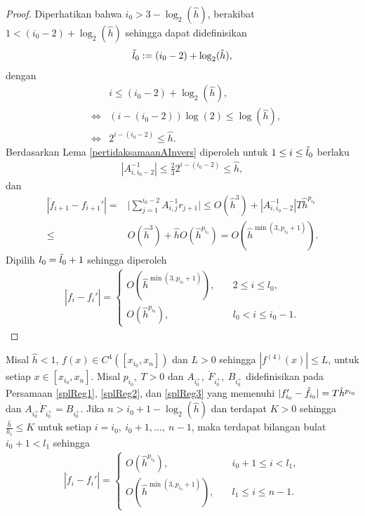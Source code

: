 \begin{proof}
    Diperhatikan bahwa $i_0 > 3 - \log_2(\hat{h})$, berakibat $1 < (i_0 - 2) + \log_2(\hat{h})$ sehingga dapat didefinisikan
    \begin{align*}
        \Tilde{l}_0 :=(i_0 - 2) + \log_2(\hat{h}),
    \end{align*}
    dengan
    \begin{align*}
        &&i \leq (i_0 - 2) + \log_2(\hat{h}), \\
        &\Leftrightarrow&(i - (i_0 - 2))\log(2) \leq \log(\hat{h}),\\
        &\Leftrightarrow&2^{i-(i_0 - 2)} \leq \hat{h}.
    \end{align*}
    Berdasarkan Lema \ref{pertidaksamaanAInvers} diperoleh untuk $1 \leq i \leq \Tilde{l}_0$ berlaku
    \begin{align*}
        |A_{i,{i_0-2}}^{-1}| \leq \frac{2}{3}2^{i-(i_0 - 2)} \leq \hat{h},
    \end{align*}
    dan 
    \begin{align*}
        |\dot{f}_{i+1} - f_{i+1}'| =& \Bigg| \sum_{j=1}^{i_0 - 2} A_{i,j}^{-1}r_{j+1} \Bigg| \leq O(\hat{h}^3) + |A_{i,{i_0-2}}^{-1}|T\hat{h}^{p_{i_0}} \\
        \leq& O(\hat{h}^3) + \hat{h}O(\hat{h}^{p_{i_0}}) = O(\hat{h}^{\min(3,p_{i_0}+1)}).
    \end{align*}
    Dipilih $l_0 = \Tilde{l}_0 + 1$ sehingga diperoleh
    \begin{align*}
        |\dot{f}_i - f_i'|=\begin{cases}
            O(\hat{h}^{\min(3,p_{i_0}+1)}), \quad &2\leq i\leq l_0,\\
            O(\hat{h}^{p_{i_0}}), \quad &l_0<i\leq i_0 - 1.
        \end{cases}
    \end{align*}
\end{proof}

\begin{proposisi}\label{prpsi_l1}
Misal $\hat{h} < 1$, $f(x) \in C^4([x_{i_0},x_{n}])$ dan $L > 0$ sehingga \mbox{$|f^{(4)}(x)| \leq L$}, untuk setiap $x\in[x_{i_0},x_{n}]$. Misal $p_{i_0},~T>0$ dan $A_{i_0^+},~\dot{F}_{i_0^+},~B_{i_0^+}$ didefinisikan pada Persamaan \eqref{splReg1}, \eqref{splReg2}, dan \eqref{splReg3} yang memenuhi $|f_{i_0}'-\Tilde{f}_{i_0}|=T\hat{h}^{p_{i_0}}$ dan $A_{i_0^+}\dot{F}_{i_0^+} = B_{i_0^+}$. Jika $n > i_0+1 - \log_2(\hat{h})$ dan terdapat $K>0$ sehingga $\frac{\hat{h}}{h_i} \leq K$ untuk setiap $i=i_0,~i_0+1,\dots,~n-1$, maka terdapat bilangan bulat $i_0+1<l_1$ sehingga
\begin{align*}
    |\dot{f}_i-f_i'|=
\begin{cases}
O(\hat{h}^{p_{i_0}}), &i_0 + 1 \leq i< l_1,\\
O(\hat{h}^{\min(3,p_{i_0}+1)}), \quad &l_1 \leq i\leq n-1.
\end{cases}
\end{align*}
\end{proposisi}

